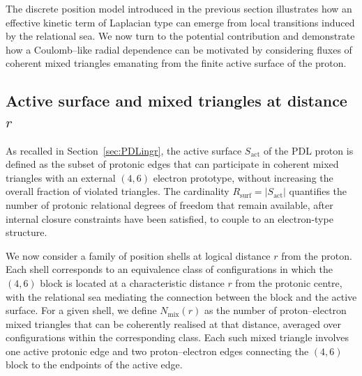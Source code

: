 \documentclass[11pt,a4paper]{article}
\begin{document}
The discrete position model introduced in the previous section illustrates how an effective kinetic term of Laplacian type can emerge from local transitions induced by the relational sea. We now turn to the potential contribution and demonstrate how a Coulomb--like radial dependence can be motivated by considering fluxes of coherent mixed triangles emanating from the finite active surface of the proton.

\subsection{Active surface and mixed triangles at distance \texorpdfstring{$r$}{r}}

As recalled in Section~\ref{sec:PDLingr}, the active surface $S_{\mathrm{act}}$ of the PDL proton is defined as the subset of protonic edges that can participate in coherent mixed triangles with an external $(4,6)$ electron prototype, without increasing the overall fraction of violated triangles.\cite{Laubscher2026DerivationAlpha} The cardinality $R_{\mathrm{surf}} = |S_{\mathrm{act}}|$ quantifies the number of protonic relational degrees of freedom that remain available, after internal closure constraints have been satisfied, to couple to an electron-type structure.\par

We now consider a family of position shells at logical distance $r$ from the proton. Each shell corresponds to an equivalence class of configurations in which the $(4,6)$ block is located at a characteristic distance $r$ from the protonic centre, with the relational sea mediating the connection between the block and the active surface. For a given shell, we define $N_{\mathrm{mix}}(r)$ as the number of proton--electron mixed triangles that can be coherently realised at that distance, averaged over configurations within the corresponding class. Each such mixed triangle involves one active protonic edge and two proton--electron edges connecting the $(4,6)$ block to the endpoints of the active edge.\par
\end{document}

